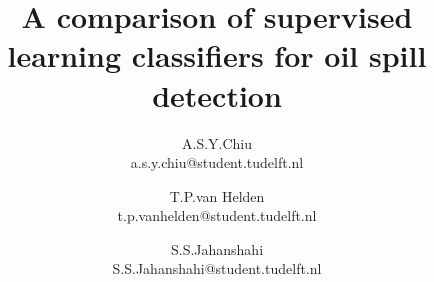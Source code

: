 \documentclass{article}
\title{\vspace{-15mm}\fontsize{18pt}{10pt}\selectfont\textbf{A comparison of supervised learning classifiers for oil spill detection}} %
\author{
A.S.Y.Chiu \\ \scriptsize{a.s.y.chiu@student.tudelft.nl}  \and
     \and T.P.van Helden \\ \scriptsize{t.p.vanhelden@student.tudelft.nl}
   \and S.S.Jahanshahi\\ \scriptsize{S.S.Jahanshahi@student.tudelft.nl}
}
\date{}
\begin{document}
\maketitle %

\thispagestyle{fancy} %


\begin{abstract}

  

\end{abstract}

\end{document}
